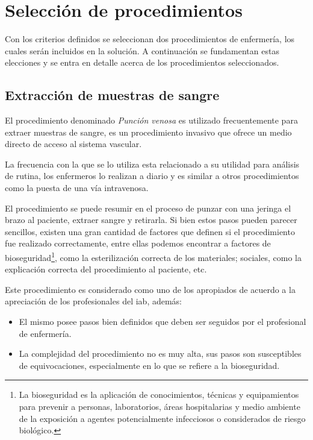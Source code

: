 \section{Selección de procedimientos}
\label{sec:seleccion_escenas}

Con los criterios definidos se seleccionan dos procedimientos
de enfermería, los cuales serán incluidos en la solución. A continuación se
fundamentan estas elecciones y se entra en detalle acerca de los
procedimientos seleccionados.


\subsection{Extracción de muestras de sangre}
\label{sec:hemocultivo}

El procedimiento denominado \emph{Punción venosa} es utilizado frecuentemente
para extraer muestras de sangre, es un procedimiento invasivo que ofrece un
medio directo de acceso al sistema vascular. 

La frecuencia con la que se lo utiliza esta relacionado a su utilidad para
análisis de rutina, los enfermeros lo realizan a diario y es similar a otros
procedimientos como la puesta de una vía intravenosa.

El procedimiento se puede resumir en el proceso de punzar con una jeringa el
brazo al paciente, extraer sangre y retirarla. Si bien estos pasos pueden
parecer sencillos, existen una gran cantidad de factores que definen si el
procedimiento fue realizado correctamente, entre ellas podemos encontrar a
factores de bioseguridad\footnote{La bioseguridad es la aplicación de
    conocimientos, técnicas y equipamientos para prevenir a personas,
    laboratorios, áreas hospitalarias y medio ambiente de la exposición a
    agentes potencialmente infecciosos o considerados de riesgo
    biológico\cite{world2005manual}.}, como la esterilización correcta de los
materiales; sociales, como la explicación correcta del procedimiento al
paciente, etc.

Este procedimiento es considerado como uno de los apropiados de acuerdo a la
apreciación de los profesionales del \Gls{iab}, además: 

\begin{itemize}
\item El mismo posee pasos bien definidos que deben ser seguidos por el
    profesional de enfermería.
\item La complejidad del procedimiento no es muy alta, sus pasos son
    susceptibles de equivocaciones, especialmente en lo que se refiere a la
    bioseguridad. 
\end{itemize}



